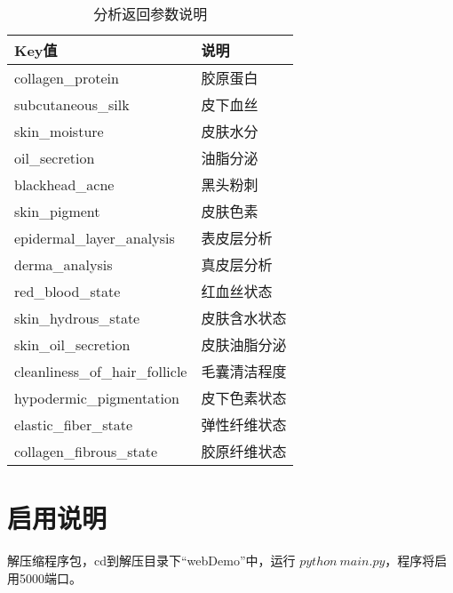 \documentclass[UTF8]{ctexbook}
\begin{document}
\begin{table}[!htbp]
\centering
\begin{tabular}{l|l}

Key值&说明\\
\hline
collagen\_protein		&	胶原蛋白	\\
subcutaneous\_silk		&	皮下血丝	\\
skin\_moisture		&	皮肤水分	\\
oil\_secretion		&	油脂分泌	\\
blackhead\_acne		&	黑头粉刺	\\
skin\_pigment		&	皮肤色素	\\
epidermal\_layer\_analysis		&	表皮层分析	\\
derma\_analysis		&	真皮层分析	\\
red\_blood\_state		&	红血丝状态	\\
skin\_hydrous\_state		&	皮肤含水状态	\\
skin\_oil\_secretion		&	皮肤油脂分泌	\\
cleanliness\_of\_hair\_follicle		&	毛囊清洁程度	\\
hypodermic\_pigmentation		&	皮下色素状态	\\
elastic\_fiber\_state		&	弹性纤维状态	\\
collagen\_fibrous\_state		&	胶原纤维状态	\\

\end{tabular}
\caption{分析返回参数说明}
\end{table}

\section{启用说明}
解压缩程序包，cd到解压目录下“webDemo”中，运行 $python~main.py$，程序将启用5000端口。


\end{document}
